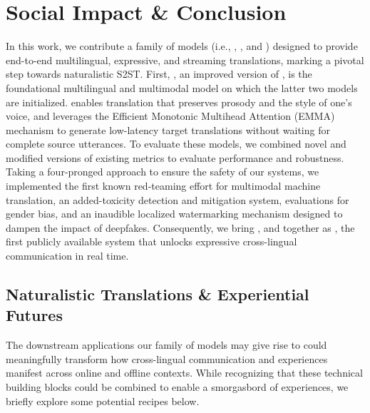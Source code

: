 \section{Social Impact \& Conclusion}
\label{sec:conclusion}

In this work, we contribute a family of models (i.e., \mfourttwo, \expressive, and \streaming) designed to provide end-to-end multilingual, expressive, and streaming translations, marking a pivotal step towards naturalistic S2ST. First, \mfourttwo, an improved version of \mfourt, is the foundational multilingual and multimodal model on which the latter two models are initialized. \expressive enables translation that preserves prosody and the style of one's voice, and \streaming leverages the Efficient Monotonic Multihead Attention (EMMA) mechanism to generate low-latency target translations without waiting for complete source utterances. To evaluate these models, we combined novel and modified versions of existing metrics to evaluate performance and robustness. Taking a four-pronged approach to ensure the safety of our systems, we implemented the first known red-teaming effort for multimodal machine translation, an added-toxicity detection and mitigation system, evaluations for gender bias, and an inaudible localized watermarking mechanism designed to dampen the impact of deepfakes. Consequently, we bring \expressive, and \streaming together as \seamless, the first publicly available system that unlocks expressive cross-lingual communication in real time.

\subsection{Naturalistic Translations \& Experiential Futures}

The downstream applications our family of models may give rise to could meaningfully transform how cross-lingual communication and experiences manifest across online and offline contexts. While recognizing that these technical building blocks could be combined to enable a smorgasbord of experiences, we briefly explore some potential recipes below.


